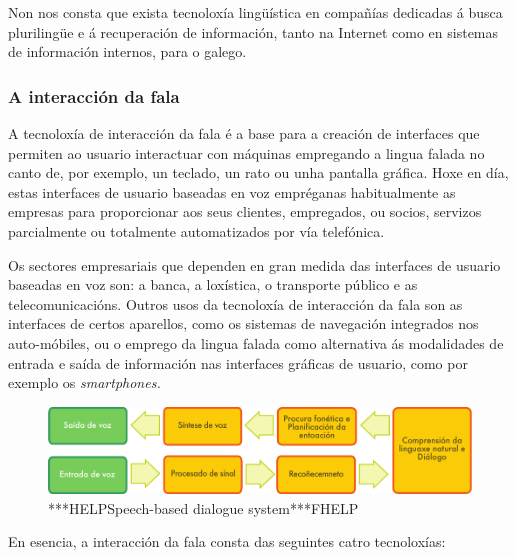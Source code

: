 \begin{multicols}{2}
Non nos consta que exista tecnoloxía lingüística en compañías dedicadas á busca plurilingüe e á recuperación de información, tanto na Internet como en sistemas de información internos, para o galego. 

  
\subsubsection{A interacción da fala}

  A tecnoloxía de interacción da fala é a base para a creación de interfaces que permiten ao usuario interactuar con máquinas empregando a lingua falada no canto de, por exemplo, un teclado, un rato ou unha pantalla gráfica. Hoxe en día, estas interfaces de usuario baseadas en voz empréganas habitualmente as empresas para proporcionar aos seus clientes, empregados, ou socios, servizos parcialmente ou totalmente automatizados por vía telefónica. 

Os sectores empresariais que dependen en gran medida das interfaces de usuario baseadas en voz son: a banca, a loxística, o transporte público e as telecomunicacións. Outros usos da tecnoloxía de interacción da fala son as interfaces de certos aparellos, como os sistemas de navegación integrados nos auto-móbiles, ou o emprego da lingua falada como alternativa ás modalidades de entrada e saída de información nas interfaces gráficas de usuario, como por exemplo os \textit{smartphones.}


\begin{figure}[htb]
  \vspace{-9mm}
  \center  \includegraphics[width=\textwidth]{../_media/galician/simple_speech-based_dialogue_architecture}
  \center
  \caption{***HELPSpeech-based dialogue system***FHELP}
  \label{fig:dialoguearch_ga}
\end{figure}

En esencia, a interacción da fala consta das seguintes catro tecnoloxías: 


\end{multicols}
